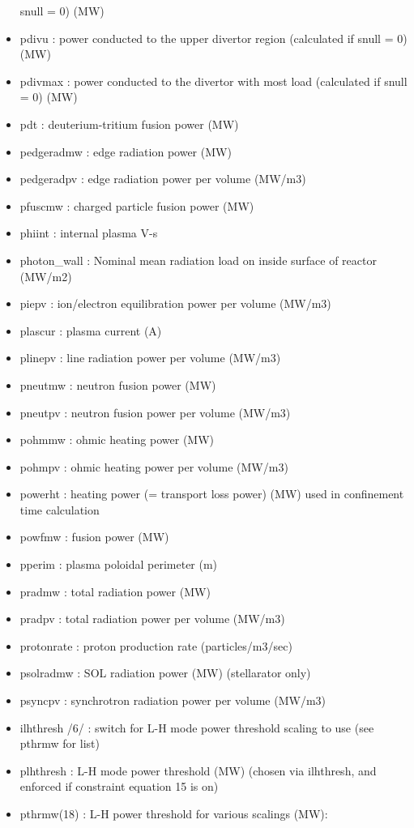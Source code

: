 \documentclass[]{article}
\begin{document}
\begin{itemize}
  snull = 0) (MW)
\item
  pdivu : power conducted to the upper divertor region (calculated if
  snull = 0) (MW)
\item
  pdivmax : power conducted to the divertor with most load (calculated
  if snull = 0) (MW)
\item
  pdt : deuterium-tritium fusion power (MW)
\item
  pedgeradmw : edge radiation power (MW)
\item
  pedgeradpv : edge radiation power per volume (MW/m3)
\item
  pfuscmw : charged particle fusion power (MW)
\item
  phiint : internal plasma V-s
\item
  photon\_wall : Nominal mean radiation load on inside surface of
  reactor (MW/m2)
\item
  piepv : ion/electron equilibration power per volume (MW/m3)
\item
  plascur : plasma current (A)
\item
  plinepv : line radiation power per volume (MW/m3)
\item
  pneutmw : neutron fusion power (MW)
\item
  pneutpv : neutron fusion power per volume (MW/m3)
\item
  pohmmw : ohmic heating power (MW)
\item
  pohmpv : ohmic heating power per volume (MW/m3)
\item
  powerht : heating power (= transport loss power) (MW) used in
  confinement time calculation
\item
  powfmw : fusion power (MW)
\item
  pperim : plasma poloidal perimeter (m)
\item
  pradmw : total radiation power (MW)
\item
  pradpv : total radiation power per volume (MW/m3)
\item
  protonrate : proton production rate (particles/m3/sec)
\item
  psolradmw : SOL radiation power (MW) (stellarator only)
\item
  psyncpv : synchrotron radiation power per volume (MW/m3)
\item
  ilhthresh /6/ : switch for L-H mode power threshold scaling to use
  (see pthrmw for list)
\item
  plhthresh : L-H mode power threshold (MW) (chosen via ilhthresh, and
  enforced if constraint equation 15 is on)
\item
  pthrmw(18) : L-H power threshold for various scalings (MW):


\end{itemize}
\end{document}
